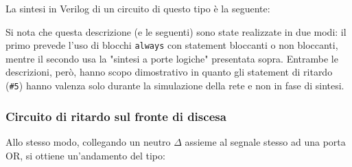 \documentclass[a4paper,11pt]{article}
\begin{document}
La sintesi in Verilog di un circuito di questo tipo è la seguente:



\lstset{language=verilog, style=codestyle}

Si nota che questa descrizione (e le seguenti) sono state realizzate in due modi: il primo prevede l'uso di blocchi \lstinline|always| con statement bloccanti o non bloccanti, mentre il secondo usa la "sintesi a porte logiche" presentata sopra.
Entrambe le descrizioni, però, hanno scopo dimostrativo in quanto gli statement di ritardo (\lstinline|#5|) hanno valenza solo durante la simulazione della rete e non in fase di sintesi. 

\subsubsection{Circuito di ritardo sul fronte di discesa}
Allo stesso modo, collegando un neutro $\Delta$ assieme al segnale stesso ad una porta OR, si ottiene un'andamento del tipo:
\end{document}
